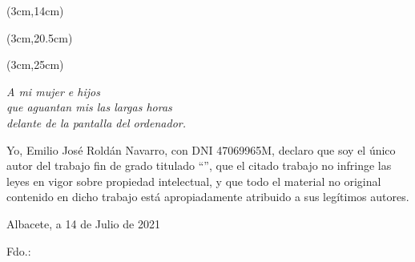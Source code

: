 \begin{textblock*}{\textwidth}(3cm,14cm) 
\begin{center}
{\fontsize{22pt}{4pt}\selectfont \bft{\titulo}}
\end{center}
\end{textblock*}


\begin{textblock*}{\textwidth}(3cm,20.5cm) 
\begin{flushleft}\doublespacing
{\fontsize{14pt}{4pt}\selectfont {} \autor}

{\fontsize{14pt}{4pt}\selectfont {} \director}

\end{flushleft}
\end{textblock*}


\begin{textblock*}{\linewidth}(3cm,25cm) 
\begin{flushright}
{\fontsize{14pt}{4pt}\selectfont \fecha}
\end{flushright}
\end{textblock*}


\cleardoublepage
\thispagestyle{empty}

\vspace*{9cm}  
\begin{flushright} \em 
A mi mujer e hijos  \\ 
que aguantan mis las largas horas \\ 
delante de la pantalla del ordenador.
\end{flushright}


\cleardoublepage
\thispagestyle{plain}
\begin{center}
\Large{}
\end{center}
\vskip1cm

Yo, Emilio José Roldán Navarro, con DNI 47069965M, declaro que soy el único autor del trabajo fin de grado titulado ``\titulo'', que 
el citado trabajo no infringe las leyes en vigor sobre propiedad intelectual, y que todo el material no original contenido 
en dicho trabajo está apropiadamente atribuido a sus legítimos autores.

\vspace*{2cm}
\begin{center}
Albacete, a 14 de Julio de 2021

\vskip3cm

Fdo.: \autor
\end{center}



